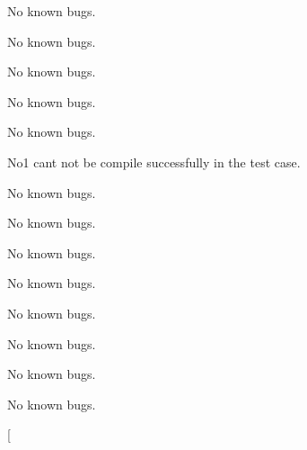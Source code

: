 
\begin{DoxyRefList}
\item[\label{bug__bug000017}%
\hypertarget{bug__bug000017}{}%
File \hyperlink{main_8cpp}{main.cpp} ]No known bugs.  
\item[\label{bug__bug000002}%
\hypertarget{bug__bug000002}{}%
Class \hyperlink{classobstacleIdentify}{obstacle\+Identify} ]No known bugs.  
\item[\label{bug__bug000001}%
\hypertarget{bug__bug000001}{}%
File \hyperlink{obstacleIdentify_8h}{obstacle\+Identify.h} ]No known bugs.  
\item[\label{bug__bug000018}%
\hypertarget{bug__bug000018}{}%
File \hyperlink{obstacleIdentifyTest_8cpp}{obstacle\+Identify\+Test.cpp} ]No known bugs.  
\item[\label{bug__bug000004}%
\hypertarget{bug__bug000004}{}%
Class \hyperlink{classpclCloudViewer}{pcl\+Cloud\+Viewer} ]No known bugs.  
\item[\label{bug__bug000003}%
\hypertarget{bug__bug000003}{}%
File \hyperlink{pclCloudViewer_8h}{pcl\+Cloud\+Viewer.h} ]No1 can\textquotesingle{}t not be compile successfully in the test case.  
\item[\label{bug__bug000006}%
\hypertarget{bug__bug000006}{}%
Class \hyperlink{classpclFastTriangular}{pcl\+Fast\+Triangular} ]No known bugs.  
\item[\label{bug__bug000005}%
\hypertarget{bug__bug000005}{}%
File \hyperlink{pclFastTriangular_8h}{pcl\+Fast\+Triangular.h} ]No known bugs.  
\item[\label{bug__bug000019}%
\hypertarget{bug__bug000019}{}%
File \hyperlink{pclFastTriangularTest_8cpp}{pcl\+Fast\+Triangular\+Test.cpp} ]No known bugs.  
\item[\label{bug__bug000008}%
\hypertarget{bug__bug000008}{}%
Class \hyperlink{classpclIo}{pcl\+Io} ]No known bugs.  
\item[\label{bug__bug000007}%
\hypertarget{bug__bug000007}{}%
File \hyperlink{pclIo_8h}{pcl\+Io.h} ]No known bugs.  
\item[\label{bug__bug000020}%
\hypertarget{bug__bug000020}{}%
File \hyperlink{pclIoTest_8cpp}{pcl\+Io\+Test.cpp} ]No known bugs.  
\item[\label{bug__bug000010}%
\hypertarget{bug__bug000010}{}%
Class \hyperlink{classpclMlsSmoothing}{pcl\+Mls\+Smoothing} ]No known bugs.  
\item[\label{bug__bug000009}%
\hypertarget{bug__bug000009}{}%
File \hyperlink{pclMlsSmoothing_8h}{pcl\+Mls\+Smoothing.h} ]No known bugs.  
\item[\label{bug__bug000021}%

\end{DoxyRefList}
